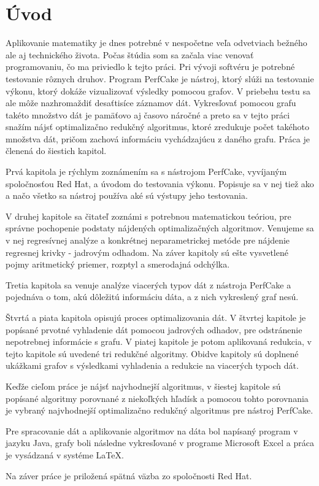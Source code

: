 \chapter*{Úvod}
 
Aplikovanie matematiky je dnes potrebné v nespočetne veľa odvetviach bežného ale aj technického života. Počas štúdia som sa začala viac venovať programovaniu, čo ma priviedlo k tejto práci. Pri vývoji softvéru je potrebné testovanie rôznych druhov. Program PerfCake je nástroj, ktorý slúži na testovanie výkonu, ktorý dokáže vizualizovať výsledky pomocou grafov. V priebehu testu sa ale môže nazhromaždiť desaťtisíce záznamov dát. Vykresľovať pomocou grafu takéto množstvo dát je pamäťovo aj časovo náročné a preto sa v tejto práci snažím nájsť optimalizačno redukčný algoritmus, ktoré zredukuje počet takéhoto množstva dát, pričom zachová informáciu vychádzajúcu z daného grafu. Práca je členená do šiestich kapitol.

Prvá kapitola je rýchlym zoznámením sa s nástrojom PerfCake, vyvíjaným spoločnosťou Red Hat, a úvodom do testovania výkonu. Popisuje sa v nej tiež ako a načo všetko sa nástroj používa aké sú výstupy jeho testovania.

V druhej kapitole sa čitateľ zoznámi s potrebnou matematickou teóriou, pre správne pochopenie podstaty nájdených optimalizačných algoritmov. Venujeme sa v nej regresívnej analýze a konkrétnej neparametrickej metóde pre nájdenie regresnej krivky - jadrovým odhadom. Na záver kapitoly sú ešte vysvetlené pojmy aritmetický priemer, rozptyl a smerodajná odchýlka.

Tretia kapitola sa venuje analýze viacerých typov dát z nástroja PerfCake a pojednáva o tom, akú dôležitú informáciu dáta, a z nich vykreslený graf nesú.

Štvrtá a piata kapitola opisujú proces optimalizovania dát. V štvrtej kapitole je popísané prvotné vyhladenie dát pomocou jadrových odhadov, pre odstránenie nepotrebnej informácie s grafu. V piatej kapitole je potom aplikovaná redukcia, v tejto kapitole sú uvedené tri redukčné algoritmy. Obidve kapitoly sú doplnené ukážkami grafov s výsledkami vyhladenia a redukcie na viacerých typoch dát.

Keďže cieľom práce je nájsť najvhodnejší algoritmus, v šiestej kapitole sú popísané algoritmy porovnané z niekoľkých hľadísk a pomocou tohto porovnania je vybraný najvhodnejší optimalizačno redukčný algoritmus pre nástroj PerfCake. 

Pre spracovanie dát a aplikovanie algoritmov na dáta bol napísaný program v jazyku Java, grafy boli následne vykresľované v programe Microsoft Excel a práca je vysádzaná v systéme \LaTeX.

Na záver práce je priložená spätná väzba zo spoločnosti Red Hat.
